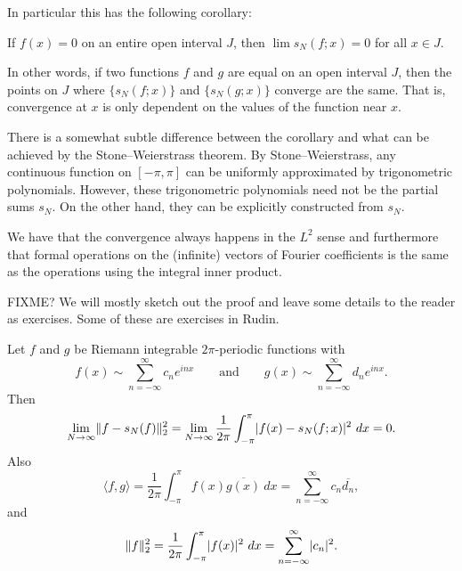 In particular this has the following corollary:

\begin{cor}
If $f(x) = 0$ on an entire open interval $J$, then $\lim s_N(f;x) = 0$
for all $x \in J$.
\end{cor}

In other words, if two functions $f$ and $g$
are equal on an open interval $J$, then the
points on $J$ where $\{ s_N(f;x) \}$ and $\{ s_N(g;x) \}$ converge are the same.  That is,
convergence at $x$ is only dependent on the values of the function
near $x$.

There is a somewhat subtle difference between the corollary and what can be
achieved by the Stone--Weierstrass theorem.  By Stone--Weierstrass, 
any continuous function on $[-\pi,\pi]$ can be uniformly approximated
by trigonometric polynomials.  However, these trigonometric polynomials need
not be the partial sums $s_N$.  On the other hand, they can be
explicitly constructed from $s_N$.

We have that the convergence always happens in the $L^2$ sense and
furthermore that formal operations on the (infinite) vectors of
Fourier coefficients is the same as the operations using the integral
inner product.

FIXME? We will mostly sketch out the proof and leave some details to the reader
as exercises.  Some of these are exercises in Rudin.


\begin{thm}[Parseval]
Let $f$ and $g$ be Riemann integrable $2\pi$-periodic functions
with
\begin{equation*}
f(x) \sim
\sum_{n=-\infty}^\infty c_n e^{inx}
\qquad \text{and} \qquad
g(x) \sim
\sum_{n=-\infty}^\infty d_n e^{inx} .
\end{equation*}
Then
\begin{equation*}
\lim_{N\to\infty} \lVert {f-s_N(f)} \rVert_2^2 = 
\lim_{N\to\infty}
\frac{1}{2\pi}
\int_{-\pi}^\pi
\lvert {f(x)-s_N(f;x)} \rvert^2 ~ dx
=0 .
\end{equation*}
Also
\begin{equation*}
\langle f , g \rangle =
\frac{1}{2\pi}
\int_{-\pi}^\pi
f(x) \overline{g(x)}~ dx
=
\sum_{n=-\infty}^\infty c_n \overline{d_n} ,
\end{equation*}
and
\begin{equation*}
\lVert {f} \rVert_2^2
=
\frac{1}{2\pi}
\int_{-\pi}^\pi
\lvert {f(x)} \rvert^2 ~ dx
=
\sum_{n=-\infty}^\infty \lvert {c_n} \rvert^2.
\end{equation*}
\end{thm}

